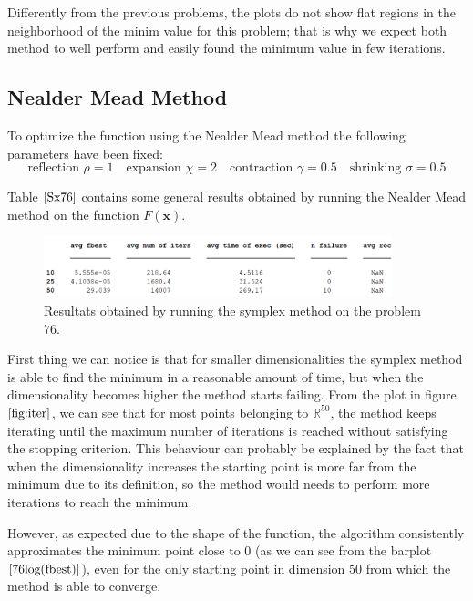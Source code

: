 Differently from the previous problems, the plots do not show flat regions in the neighborhood of the minim value for this problem; that is why we expect both method to well perform and easily found the minimum value in few iterations.  

\medskip
\subsection*{Nealder Mead Method}
To optimize the function using the Nealder Mead method the following parameters have been fixed:
\begin{equation*}
    \text{reflection } \rho = 1 \quad
    \text{expansion } \chi = 2 \quad
    \text{contraction } \gamma = 0.5 \quad
    \text{shrinking } \sigma = 0.5
\end{equation*}

Table $\eqref{Sx76}$ contains some general results obtained by running the Nealder Mead method on the function $F(\mathbf{x})$.

\begin{figure}[htbp]
    \centering
    \includegraphics[width = 0.9\textwidth]{img/pb76_table_SX.png}
    \caption{Resultats obtained by running the symplex method on the problem $76$.}
    \label{Sx76}
\end{figure}

First thing we can notice is that for smaller dimensionalities the symplex method is able to find the minimum in a reasonable amount of time, but when the dimensionality becomes higher the method starts failing.
From the plot in figure $\eqref{fig:iter}$, we can see that for most points belonging to $\mathbb{R}^{50}$, the method keeps iterating until the maximum number of iterations is reached without satisfying the stopping criterion.
This behaviour can probably be explained by the fact that when the dimensionality increases the starting point is more far from the minimum due to its definition, so the method would needs to perform more iterations to reach the minimum.

However, as expected due to the shape of the function, the algorithm consistently approximates the minimum point close to $0$ (as we can see from the barplot $\eqref{76log(fbest)}$), even for the only starting point in dimension $50$ from which the method is able to converge.

